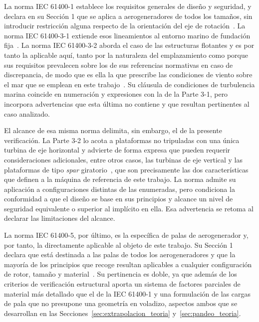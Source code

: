 La norma IEC 61400-1 establece los requisitos generales de diseño y seguridad, y declara en su Sección 1 que se aplica a aerogeneradores de todos los tamaños, sin introducir restricción alguna respecto de la orientación del eje de rotación~\parencite*{IEC61400-1}. La norma IEC 61400-3-1 extiende esos lineamientos al entorno marino de fundación fija~\parencite*{IEC61400-3-1}. La norma IEC 61400-3-2 aborda el caso de las estructuras flotantes y es por tanto la aplicable aquí, tanto por la naturaleza del emplazamiento como porque sus requisitos prevalecen sobre los de sus referencias normativas en caso de discrepancia, de modo que es ella la que prescribe las condiciones de viento sobre el mar que se emplean en este trabajo~\parencite*{IEC61400-3-2}. Su cláusula de condiciones de turbulencia marina coincide en numeración y expresiones con la de la Parte 3-1, pero incorpora advertencias que esta última no contiene y que resultan pertinentes al caso analizado.

El alcance de esa misma norma delimita, sin embargo, el de la presente verificación. La Parte 3-2 lo acota a plataformas no tripuladas con una única turbina de eje horizontal y advierte de forma expresa que pueden requerir consideraciones adicionales, entre otros casos, las turbinas de eje vertical y las plataformas de tipo \textit{spar} giratorio~\parencite{IEC61400-3-2}, que son precisamente las dos características que definen a la máquina de referencia de este trabajo. La norma admite su aplicación a configuraciones distintas de las enumeradas, pero condiciona la conformidad a que el diseño se base en sus principios y alcance un nivel de seguridad equivalente o superior al implícito en ella. Esa advertencia se retoma al declarar las limitaciones del alcance.

La norma IEC 61400-5, por último, es la específica de palas de aerogenerador y, por tanto, la directamente aplicable al objeto de este trabajo. Su Sección 1 declara que está destinada a las palas de todos los aerogeneradores y que la mayoría de los principios que recoge resultan aplicables a cualquier configuración de rotor, tamaño y material~\parencite{IEC61400-5}. Su pertinencia es doble, ya que además de los criterios de verificación estructural aporta un sistema de factores parciales de material más detallado que el de la IEC 61400-1 y una formulación de las cargas de pala que no presupone una geometría en voladizo, aspectos ambos que se desarrollan en las Secciones~\ref{sec:extrapolacion_teoria} y~\ref{sec:pandeo_teoria}.

